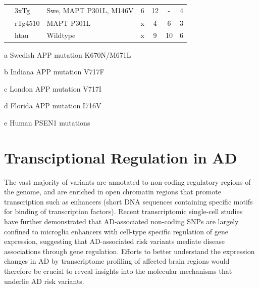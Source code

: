 \begin{table}[htp]
\begin{threeparttable}
\begin{tabular}{@{}lllcccc@{}}
			& 3xTg                  & Swe\tnote{a}, MAPT P301L, M146V     & 6  & 12 & -    & 4                \\
			& rTg4510               & MAPT P301L                 & x  & 4  & 6     & 3                \\
			& htau                  & Wildtype                   & x  & 9  & 10    & 6                \\ \cmidrule(l){1-7} 
		\end{tabular}
		\begin{tablenotes}
			\footnotesize
			\item[a] Swedish APP mutation K670N/M671L
			\item[b] Indiana APP mutation V717F
			\item[c] London APP mutation V717I
			\item[d] Florida APP mutation I716V 
			\item[e] Human PSEN1 mutations 
		\end{tablenotes}
	\end{threeparttable}
\end{table}




\clearpage
\section{Transciptional Regulation in AD}

The vast majority of variants are annotated to non-coding regulatory regions of the genome, and are enriched in open chromatin regions that promote transcription such as enhancers\cite{Kikuchi2019} (short DNA sequences containing specific motifs for binding of transcription factors). Recent transcriptomic single-cell studies have further demonstrated that AD-associated non-coding SNPs are largely confined to microglia enhancers with cell-type specific regulation of gene expression\cite{Tansey2018,Nott2019,Young2021,Novikova2021}, suggesting that AD-associated risk variants mediate disease associations through gene regulation. Efforts to better understand the expression changes in AD by transcriptome profiling of affected brain regions would therefore be crucial to reveal insights into the molecular mechanisms that underlie AD risk variants.

